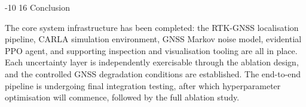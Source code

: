 \documentclass{sig-alternate}
\makeatletter
\renewcommand\section{\@startsection{section}{1}{\z@}%
    {-10\p@ \@plus -4\p@ \@minus -2\p@}%
    {16\p@}%
    {\baselineskip 14pt\secfnt\@ucheadtrue}}
\makeatother
\begin{document}

\section{Conclusion}
\label{sec:conclusion}

The core system infrastructure has been completed: the RTK-GNSS localisation pipeline, CARLA simulation environment, GNSS Markov noise model, evidential PPO agent, and supporting inspection and visualisation tooling are all in place. Each uncertainty layer is independently exercisable through the ablation design, and the controlled GNSS degradation conditions are established. The end-to-end pipeline is undergoing final integration testing, after which hyperparameter optimisation will commence, followed by the full ablation study.


\newpage
{\small
\vspace*{-20pt}


}
\end{document}

